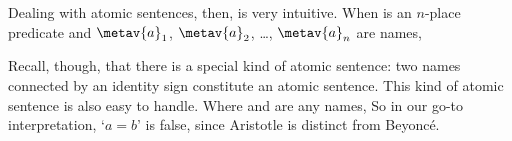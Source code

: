 Dealing with atomic sentences, then, is very intuitive. When  is an $n$-place predicate and $\metav{a}_1$, $\metav{a}_{2}$, \dots, $\metav{a}_{n}$ are names, 

Recall, though, that there is a special kind of atomic sentence: two names connected by an identity sign constitute an atomic sentence. This kind of atomic sentence is also easy to handle. Where  and  are any names, 
So in our go-to interpretation, `$a = b$' is false, since Aristotle is distinct from Beyonc\'e.


